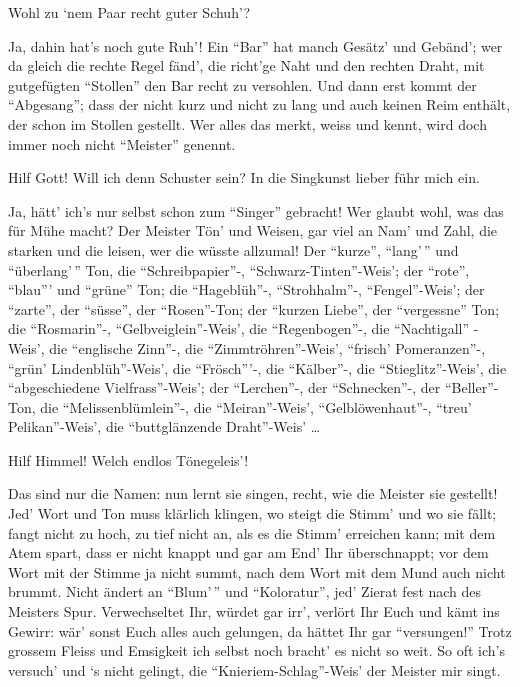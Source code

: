 \begin{drama}
\Waltherspeaks
Wohl zu ‘nem Paar recht guter Schuh'?

\Davidspeaks
Ja, dahin hat's noch gute Ruh'!
Ein ``Bar'' hat manch Gesätz' und Gebänd';
wer da gleich die rechte Regel fänd',
die richt'ge Naht und den rechten Draht,
mit gutgefügten ``Stollen'' den Bar recht zu versohlen.
Und dann erst kommt der ``Abgesang'';
dass der nicht kurz und nicht zu lang
und auch keinen Reim enthält,
der schon im Stollen gestellt.
Wer alles das merkt, weiss und kennt,
wird doch immer noch nicht ``Meister'' genennt.

\Waltherspeaks
Hilf Gott! Will ich denn Schuster sein?
In die Singkunst lieber führ mich ein.

\Davidspeaks
Ja, hätt' ich's nur selbst schon zum ``Singer'' gebracht!
Wer glaubt wohl, was das für Mühe macht?
Der Meister Tön' und Weisen,
gar viel an Nam' und Zahl,
die starken und die leisen,
wer die wüsste allzumal!
Der ``kurze'', ``lang'\,'' und ``überlang'\,'' Ton,
die ``Schreibpapier''-, ``Schwarz-Tinten''-Weis';
der ``rote'', ``blau''' und ``grüne'' Ton;
die ``Hageblüh''-, ``Strohhalm''-, ``Fengel''-Weis';
der ``zarte'', der ``süsse'', der ``Rosen''-Ton;
der ``kurzen Liebe'', der ``vergessne'' Ton;
die ``Rosmarin''-, ``Gelbveiglein''-Weis',
die ``Regenbogen''-, die ``Nachtigall'' -Weis',
die ``englische Zinn''-, die ``Zimmtröhren''-Weis',
``frisch' Pomeranzen''-, ``grün' Lindenblüh''-Weis',
die ``Frösch'''-, die ``Kälber''-, die ``Stieglitz''-Weis',
die ``abgeschiedene Vielfrass''-Weis';
der ``Lerchen''-, der ``Schnecken''-, der ``Beller''-Ton,
die ``Melissenblümlein''-, die ``Meiran''-Weis',
``Gelblöwenhaut''-,
``treu' Pelikan''-Weis',
die ``buttglänzende Draht''-Weis' \ldots 

\Waltherspeaks
Hilf Himmel! Welch endlos Tönegeleis'!

\Davidspeaks
Das sind nur die Namen:
nun lernt sie singen,
recht, wie die Meister sie gestellt!
Jed' Wort und Ton muss klärlich klingen, 
wo steigt die Stimm' und wo sie fällt;
fangt nicht zu hoch, zu tief nicht an,
als es die Stimm' erreichen kann;
mit dem Atem spart, dass er nicht knappt
und gar am End' Ihr überschnappt;
vor dem Wort mit der Stimme ja nicht summt,
nach dem Wort mit dem Mund auch nicht brummt.
Nicht ändert an ``Blum'\,'' und ``Koloratur'',
jed' Zierat fest nach des Meisters Spur.
Verwechseltet Ihr, würdet gar irr',
verlört Ihr Euch und kämt ins Gewirr:
wär' sonst Euch alles auch gelungen,
da hättet Ihr gar ``versungen!''
Trotz grossem Fleiss und Emsigkeit
ich selbst noch bracht' es nicht so weit.
So oft ich's versuch' und ‘s nicht gelingt,
die ``Knieriem-Schlag''-Weis' der Meister mir singt.


\end{drama}
